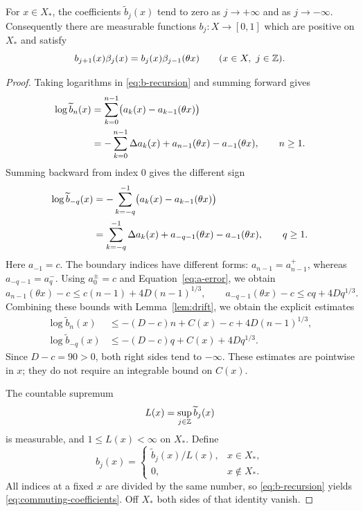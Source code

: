 \begin{lemma}\label{lem:normalization}
For $x\in X_*$, the coefficients $\widetilde b_j(x)$ tend to zero as $j\to+\infty$ and as $j\to-\infty$. Consequently there are measurable functions $b_j:X\to[0,1]$ which are positive on $X_*$ and satisfy
\begin{equation}\label{eq:commuting-coefficients}
 b_{j+1}(x)\beta_j(x)=b_j(x)\beta_{j-1}(\theta x)
 \qquad(x\in X,\ j\in\mathbb Z).
\end{equation}
\end{lemma}
\begin{proof}
Taking logarithms in \eqref{eq:b-recursion} and summing forward gives
\begin{align}
 \log\widetilde b_n(x)
 &=\sum_{k=0}^{n-1}\bigl(a_k(x)-a_{k-1}(\theta x)\bigr)\notag\\
 &=-\sum_{k=0}^{n-1}\Delta a_k(x)
       +a_{n-1}(\theta x)-a_{-1}(\theta x),\qquad n\ge1.\label{eq:b-positive}
\end{align}
Summing backward from index $0$ gives the different sign
\begin{align}
 \log\widetilde b_{-q}(x)
 &=-\sum_{k=-q}^{-1}\bigl(a_k(x)-a_{k-1}(\theta x)\bigr)\notag\\
 &=\sum_{k=-q}^{-1}\Delta a_k(x)
       +a_{-q-1}(\theta x)-a_{-1}(\theta x),\qquad q\ge1.\label{eq:b-negative}
\end{align}
Here $a_{-1}=c$. The boundary indices have different forms:
$a_{n-1}=a_{n-1}^+$, whereas $a_{-q-1}=a_q^-$. Using $a_0^\pm=c$ and Equation~\eqref{eq:a-error}, we obtain
\[
 a_{n-1}(\theta x)-c\le c(n-1)+4D(n-1)^{1/3},\qquad
 a_{-q-1}(\theta x)-c\le cq+4Dq^{1/3}.
\]
Combining these bounds with Lemma~\ref{lem:drift}, we obtain the explicit estimates
\begin{align*}
 \log\widetilde b_n(x)&\le -(D-c)n+C(x)-c+4D(n-1)^{1/3},\\
 \log\widetilde b_{-q}(x)&\le -(D-c)q+C(x)+4Dq^{1/3}.
\end{align*}
Since $D-c=90>0$, both right sides tend to $-\infty$. These estimates are pointwise in $x$; they do not require an integrable bound on $C(x)$.

The countable supremum
\[
 L(x)=\sup_{j\in\mathbb Z}\widetilde b_j(x)
\]
is measurable, and $1\le L(x)<\infty$ on $X_*$. Define
\[
 b_j(x)=\begin{cases}\widetilde b_j(x)/L(x),&x\in X_*,\\0,&x\notin X_*.
 \end{cases}
\]
All indices at a fixed $x$ are divided by the same number, so \eqref{eq:b-recursion} yields \eqref{eq:commuting-coefficients}. Off $X_*$ both sides of that identity vanish.
\end{proof}

